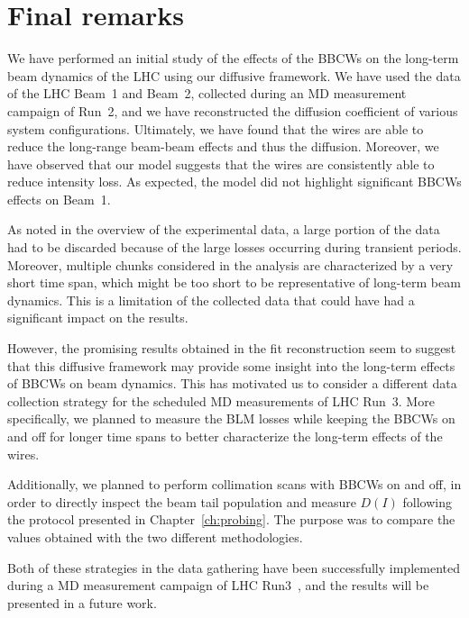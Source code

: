 
\section{Final remarks}\label{sec:5:conclusions}

We have performed an initial study of the effects of the BBCWs on the long-term beam dynamics of the LHC using our diffusive framework. We have used the data of the LHC Beam~1 and Beam~2, collected during an MD measurement campaign of Run~2, and we have reconstructed the diffusion coefficient of various system configurations. Ultimately, we have found that the wires are able to reduce the long-range beam-beam effects and thus the diffusion. Moreover, we have observed that our model suggests that the wires are consistently able to reduce intensity loss. As expected, the model did not highlight significant BBCWs effects on Beam~1.

As noted in the overview of the experimental data, a large portion of the data had to be discarded because of the large losses occurring during transient periods. Moreover, multiple chunks considered in the analysis are characterized by a very short time span, which might be too short to be representative of long-term beam dynamics. This is a limitation of the collected data that could have had a significant impact on the results.

However, the promising results obtained in the fit reconstruction seem to suggest that this diffusive framework may provide some insight into the long-term effects of BBCWs on beam dynamics. This has motivated us to consider a different data collection strategy for the scheduled MD measurements of LHC Run~3. More specifically, we planned to measure the BLM losses while keeping the BBCWs on and off for longer time spans to better characterize the long-term effects of the wires.

Additionally, we planned to perform collimation scans with BBCWs on and off, in order to directly inspect the beam tail population and measure $D(I)$ following the protocol presented in Chapter~\ref{ch:probing}. The purpose was to compare the values obtained with the two different methodologies.

Both of these strategies in the data gathering have been successfully implemented during a MD measurement campaign of LHC Run3~\cite{MDrun3wires}, and the results will be presented in a future work.